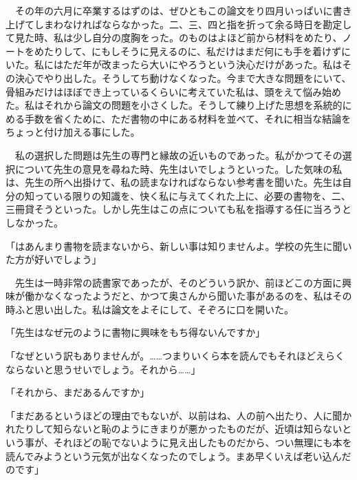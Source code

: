 \documentclass[a4j,onecolumn]{tarticle}
\begin{document}
　その年の六月に卒業するはずのは、\hbox{}ぜひともこの論文をり四月いっぱいに書き上げてしまわなければならなかった。\hbox{}二、\hbox{}三、\hbox{}四と指を折って余る時日を勘定して見た時、\hbox{}私は少し自分の度胸をった。\hbox{}のものはよほど前から材料をめたり、\hbox{}ノートをめたりして、\hbox{}にもしそうに見えるのに、\hbox{}私だけはまだ何にも手を着けずにいた。\hbox{}私にはただ年が改まったら大いにやろうという決心だけがあった。\hbox{}私はその決心でやり出した。\hbox{}そうしてち動けなくなった。\hbox{}今まで大きな問題をにいて、\hbox{}骨組みだけはほぼでき上っているくらいに考えていた私は、\hbox{}頭をえて悩み始めた。\hbox{}私はそれから論文の問題を小さくした。\hbox{}そうして練り上げた思想を系統的にめる手数を省くために、\hbox{}ただ書物の中にある材料を並べて、\hbox{}それに相当な結論をちょっと付け加える事にした。\hbox{}\par{}
　私の選択した問題は先生の専門と縁故の近いものであった。\hbox{}私がかつてその選択について先生の意見を尋ねた時、\hbox{}先生はいでしょうといった。\hbox{}した気味の私は、\hbox{}先生の所へ出掛けて、\hbox{}私の読まなければならない参考書を聞いた。\hbox{}先生は自分の知っている限りの知識を、\hbox{}快く私に与えてくれた上に、\hbox{}必要の書物を、\hbox{}二、\hbox{}三冊貸そうといった。\hbox{}しかし先生はこの点についても私を指導する任に当ろうとしなかった。\hbox{}\par{}
「はあんまり書物を読まないから、\hbox{}新しい事は知りませんよ。\hbox{}学校の先生に聞いた方が好いでしょう」\par{}
　先生は一時非常の読書家であったが、\hbox{}そのどういう訳か、\hbox{}前ほどこの方面に興味が働かなくなったようだと、\hbox{}かつて奥さんから聞いた事があるのを、\hbox{}私はその時ふと思い出した。\hbox{}私は論文をよそにして、\hbox{}そぞろに口を開いた。\hbox{}\par{}
「先生はなぜ元のように書物に興味をもち得ないんですか」\par{}
「なぜという訳もありませんが。\hbox{}……つまりいくら本を読んでもそれほどえらくならないと思うせいでしょう。\hbox{}それから……」\par{}
「それから、\hbox{}まだあるんですか」\par{}
「まだあるというほどの理由でもないが、\hbox{}以前はね、\hbox{}人の前へ出たり、\hbox{}人に聞かれたりして知らないと恥のようにきまりが悪かったものだが、\hbox{}近頃は知らないという事が、\hbox{}それほどの恥でないように見え出したものだから、\hbox{}つい無理にも本を読んでみようという元気が出なくなったのでしょう。\hbox{}まあ早くいえば老い込んだのです」\par{}
\end{document}
